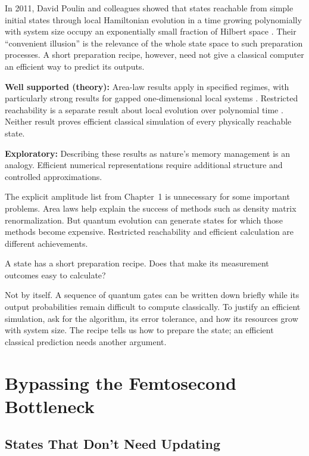 In 2011, David Poulin and colleagues showed that states reachable from simple initial states through local Hamiltonian evolution in a time growing polynomially with system size occupy an exponentially small fraction of Hilbert space \cite{poulin2011}. Their ``convenient illusion'' is the relevance of the whole state space to such preparation processes. A short preparation recipe, however, need not give a classical computer an efficient way to predict its outputs.

\begin{researchnotebox}
\textbf{Well supported (theory):} Area-law results apply in specified regimes, with particularly strong results for gapped one-dimensional local systems \cite{eisert2010}. Restricted reachability is a separate result about local evolution over polynomial time \cite{poulin2011}. Neither result proves efficient classical simulation of every physically reachable state.

\textbf{Exploratory:} Describing these results as nature's memory management is an analogy. Efficient numerical representations require additional structure and controlled approximations.
\end{researchnotebox}

The explicit amplitude list from Chapter~1 is unnecessary for some important problems. Area laws help explain the success of methods such as density matrix renormalization. But quantum evolution can generate states for which those methods become expensive. Restricted reachability and efficient calculation are different achievements.

\begin{quickpracticebox}
A state has a short preparation recipe. Does that make its measurement outcomes easy to calculate?

Not by itself. A sequence of quantum gates can be written down briefly while its output probabilities remain difficult to compute classically. To justify an efficient simulation, ask for the algorithm, its error tolerance, and how its resources grow with system size. The recipe tells us how to prepare the state; an efficient classical prediction needs another argument.
\end{quickpracticebox}

\section{Bypassing the Femtosecond Bottleneck}

\subsection{States That Don't Need Updating}

